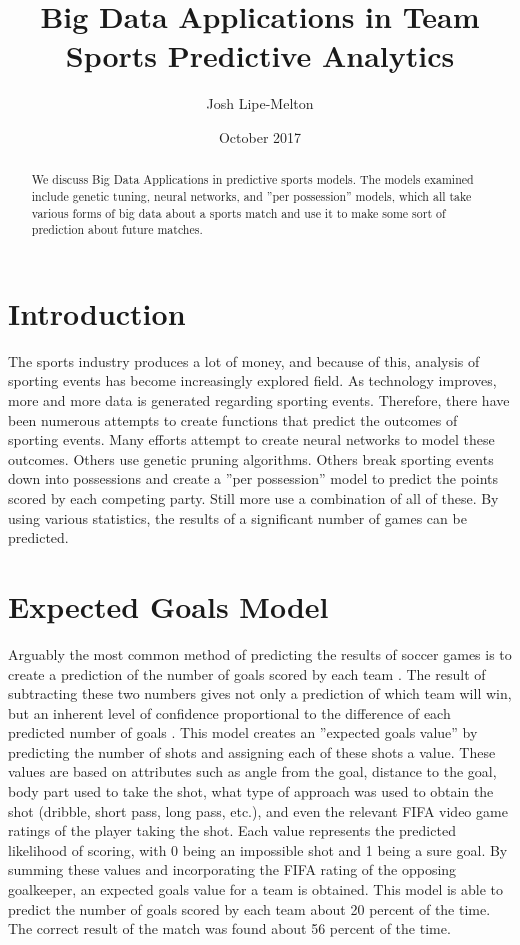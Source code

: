 \documentclass[sigconf]{acmart}
\begin{document}
\title{Big Data Applications in Team Sports Predictive Analytics}

\author{Josh Lipe-Melton}

\date{October 2017}

\begin{abstract}
We discuss Big Data Applications in predictive sports models. The models examined include genetic tuning, neural networks, and ''per possession'' models, which all take various forms of big data about a sports match and use it to make some sort of prediction about future matches.
\end{abstract}


\maketitle

\section{Introduction}
The sports industry produces a lot of money, and because of this, analysis of sporting events has become increasingly explored field. As technology improves, more and more data is generated regarding sporting events. Therefore, there have been numerous attempts to create functions that predict the outcomes of sporting events. Many efforts attempt to create neural networks to model these outcomes. Others use genetic pruning algorithms. Others break sporting events down into possessions and create a ''per possession'' model to predict the points scored by each competing party. Still more use a combination of all of these. By using various statistics, the results of a significant number of games can be predicted.

\section{Expected Goals Model}
Arguably the most common method of predicting the results of soccer games is to create a prediction of the number of goals scored by each team . The result of subtracting these two numbers gives not only a prediction of which team will win, but an inherent level of confidence proportional to the difference of each predicted number of goals \cite{ExpectedGoals}. This model creates an ''expected goals value'' by predicting the number of shots and assigning each of these shots a value. These values are based on attributes such as angle from the goal, distance to the goal, body part used to take the shot, what type of approach was used to obtain the shot (dribble, short pass, long pass, etc.), and even the relevant FIFA video game ratings of the player taking the shot. Each value represents the predicted likelihood of scoring, with 0 being an impossible shot and 1 being a sure goal. By summing these values and incorporating the FIFA rating of the opposing goalkeeper, an expected goals value for a team is obtained. This model is able to predict the number of goals scored by each team about 20 percent of the time. The correct result of the match was found about 56 percent of the time\cite{ExpectedGoals}. 
\end{document}
